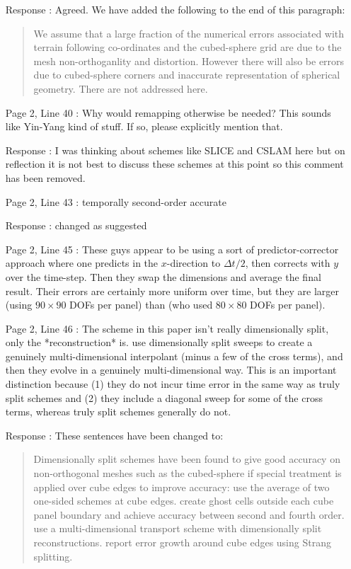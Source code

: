 \documentclass[12pt]{article}
\begin{document}
\begin{enumerate}
\item [Response]: Agreed. We have added the following to the end of this paragraph:
\begin{quote}
We assume that a large fraction of the numerical errors associated with terrain following co-ordinates and the cubed-sphere grid are due to the mesh non-orthoganlity and distortion. However there will also be errors due to cubed-sphere corners and inaccurate representation of spherical geometry. There are not addressed here. 
\end{quote}

\item [Page 2, Line 40]: Why would remapping otherwise be needed? This sounds like Yin-Yang kind of stuff. If so, please explicitly mention that.

\item [Response]: I was thinking about schemes like SLICE and CSLAM here but on reflection it is not best to discuss these schemes at this point so this comment has been removed. 

\item [Page 2, Line 43]: temporally second-order accurate

\item [Response]: changed as suggested

\item [Page 2, Line 45]: These guys \cite[]{PL07} appear to be using a sort of predictor-corrector approach where one predicts in the $x$-direction to $\Delta t/2$, then corrects with $y$ over the time-step. Then they swap the dimensions and average the final result. Their errors are certainly more uniform over time, but they are larger (using $90\times 90$ DOFs per panel) than \cite{GNQ14} (who used $80\times 80$ DOFs per panel).

\item [Page 2, Line 46]: The scheme \cite[]{KNK15} in this paper isn't really dimensionally split, only the *reconstruction* is. \cite{KNK15} use dimensionally split sweeps to create a genuinely multi-dimensional interpolant (minus a few of the cross terms), and then they evolve in a genuinely multi-dimensional way. This is an important distinction because (1) they do not incur time error in the same way as truly split schemes and (2) they include a diagonal sweep for some of the cross terms, whereas truly split schemes generally do not.

\item [Response]: These sentences have been changed to:
\begin{quote}
Dimensionally split schemes have been found to give good accuracy on non-orthogonal meshes such as the cubed-sphere if special treatment is applied over cube edges to improve accuracy: \cite{PL07} use the average of two one-sided schemes at cube edges. \cite{KNK15} create ghost cells outside each cube panel boundary and achieve accuracy between second and fourth order. \cite{KNK15} use a multi-dimensional transport scheme with dimensionally split reconstructions. \cite[eg]{GNQ14} report error growth around cube edges using Strang splitting. 
\end{quote}


\end{enumerate}
\end{document}
